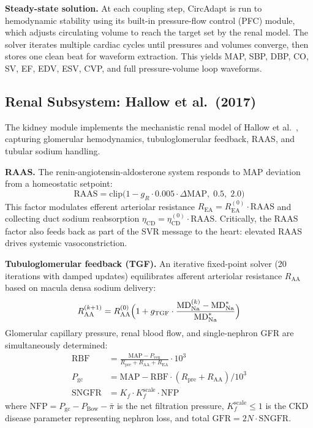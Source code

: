 \documentclass[pmlr]{jmlr}
\begin{document}
\textbf{Steady-state solution.} At each coupling step, CircAdapt is run to hemodynamic stability using its built-in pressure-flow control (PFC) module, which adjusts circulating volume to reach the target set by the renal model. The solver iterates multiple cardiac cycles until pressures and volumes converge, then stores one clean beat for waveform extraction. This yields MAP, SBP, DBP, CO, SV, EF, EDV, ESV, CVP, and full pressure-volume loop waveforms.

\subsection{Renal Subsystem: Hallow et al.\ (2017)}
\label{sec:kidney}

The kidney module implements the mechanistic renal model of Hallow et al.~\citep{hallow2017}, capturing glomerular hemodynamics, tubuloglomerular feedback, RAAS, and tubular sodium handling.

\textbf{RAAS.} The renin-angiotensin-aldosterone system responds to MAP deviation from a homeostatic setpoint:
\begin{equation}
\text{RAAS} = \text{clip}\bigl(1 - g_R \cdot 0.005 \cdot \Delta\text{MAP},\; 0.5,\; 2.0\bigr)
\label{eq:raas}
\end{equation}
This factor modulates efferent arteriolar resistance $R_{\text{EA}} = R_{\text{EA}}^{(0)} \cdot \text{RAAS}$ and collecting duct sodium reabsorption $\eta_{\text{CD}} = \eta_{\text{CD}}^{(0)} \cdot \text{RAAS}$. Critically, the RAAS factor also feeds back as part of the SVR message to the heart: elevated RAAS drives systemic vasoconstriction.

\textbf{Tubuloglomerular feedback (TGF).} An iterative fixed-point solver (20 iterations with damped updates) equilibrates afferent arteriolar resistance $R_{\text{AA}}$ based on macula densa sodium delivery:
\begin{equation}
R_{\text{AA}}^{(k+1)} = R_{\text{AA}}^{(0)} \Bigl(1 + g_{\text{TGF}} \cdot \frac{\text{MD}_{\text{Na}}^{(k)} - \text{MD}_{\text{Na}}^{*}}{\text{MD}_{\text{Na}}^{*}}\Bigr)
\label{eq:tgf}
\end{equation}
Glomerular capillary pressure, renal blood flow, and single-nephron GFR are simultaneously determined:
\begin{align}
\text{RBF} &= \frac{\text{MAP} - P_{\text{ven}}}{R_{\text{pre}} + R_{\text{AA}} + R_{\text{EA}}} \cdot 10^3 \label{eq:rbf}\\
P_{\text{gc}} &= \text{MAP} - \text{RBF} \cdot (R_{\text{pre}} + R_{\text{AA}}) / 10^3 \label{eq:pgc}\\
\text{SNGFR} &= K_f \cdot K_f^{\text{scale}} \cdot \text{NFP} \label{eq:sngfr}
\end{align}
where $\text{NFP} = P_{\text{gc}} - P_{\text{Bow}} - \bar{\pi}$ is the net filtration pressure, $K_f^{\text{scale}} \leq 1$ is the CKD disease parameter representing nephron loss, and total $\text{GFR} = 2N \cdot \text{SNGFR}$.
\end{document}
